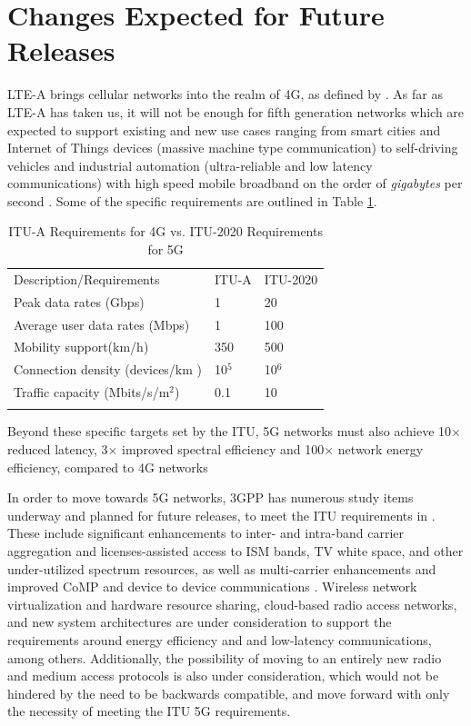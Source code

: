 \section {Changes Expected for Future Releases}
\label{fut-chnge}
LTE-A brings cellular networks into the realm of 4G, as defined by \cite{itu-advanced}.  As far as LTE-A has taken us, it will not be enough for fifth generation networks which are expected to support existing and new use cases ranging from smart cities and Internet of Things devices (massive machine type communication) to self-driving vehicles and industrial automation (ultra-reliable and low latency communications) with  high speed mobile broadband on the order of \emph{gigabytes} per second \cite{itu-2020}.  Some of the specific requirements are outlined in Table \ref{5g-table}.
\begin{table}
	\caption{ITU-A Requirements for 4G vs. ITU-2020 Requirements for 5G  \cite{itu-2020}}
	\label{5g-table}      
	\begin{tabular}{p{}p{}p{}}
		\hline\noalign{\smallskip}
		Description/Requirements & ITU-A & ITU-2020  \\
		\noalign{\smallskip}\svhline\noalign{\smallskip}
		Peak data rates (Gbps) & 1  & 20\\
		Average user data rates (Mbps) & 1  & 100  \\				
		Mobility support(km/h) & 350  & 500 \\
		Connection density (devices/km )& 10$^5$ & 10$^6$ \\
		Traffic capacity (Mbits/s/m$^2$) & 0.1 & 10 \\
		\noalign{\smallskip}\hline\noalign{\smallskip}
	\end{tabular}
		
\end{table}
Beyond these specific targets set by the ITU, 5G networks must also achieve 10$\times$ reduced latency, 3$\times$ improved spectral efficiency and  100$\times$ network energy efficiency, compared to 4G networks 

In order to move towards 5G networks, 3GPP has numerous study items underway and planned for future releases, to meet the ITU requirements in \cite{itu-2020}.  These include significant enhancements to inter- and intra-band carrier aggregation and licenses-assisted access to ISM bands, TV white space, and other under-utilized spectrum resources, as well as multi-carrier enhancements and improved CoMP and device to device communications \cite{lteA-gantt}.  Wireless network virtualization and hardware resource sharing, cloud-based radio access networks, and new system architectures are under consideration to support the requirements around energy efficiency and and low-latency communications, among others.  Additionally, the possibility of moving to an entirely new radio and medium access protocols is also under consideration, which would not be hindered by the need to be backwards compatible, and move forward with only the necessity of meeting the ITU 5G requirements. 


